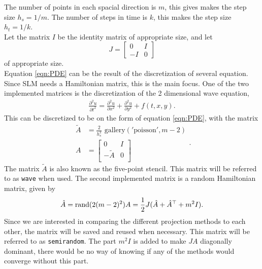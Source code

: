 The number of points in each spacial direction is $m$, this gives makes the step size $h_s = 1/m$. The number of steps in time is $k$, this makes the step size $h_t = 1/k$.\\

Let the matrix $I$ be the identity matrix of appropriate size, and let 
\begin{equation}
J = 
\begin{bmatrix}
0&I\\-I&0
\end{bmatrix}
\end{equation}
of appropriate size.\\

Equation \eqref{eqn:PDE} can be the result of the discretization of several equation. Since SLM needs a Hamiltonian matrix, this is the main focus. One of the two implemented matrices is the discretization of the 2 dimensional wave equation, 
\begin{equation}
\begin{aligned}
\frac{\partial^2 u}{\partial t^2} = \frac{\partial^2 u}{\partial x^2}+ \frac{\partial^2 u}{\partial y^2} + f(t,x,y).
\end{aligned}
\label{eqn:wave}
\end{equation}
This can be discretized to be on the form of equation \eqref{eqn:PDE}, with the matrix
\begin{equation}
\begin{aligned}
\tilde{A} &= \frac{2}{h_s^2} \text{ gallery}('\text{poisson}', m-2) \\
A &= 
\begin{bmatrix}
 0 & I \\ - \tilde{A} & 0 \\
\end{bmatrix}
\end{aligned}.
\end{equation}
The matrix $\tilde{A}$ is also known as the five-point stencil. This matrix will be referred to as \texttt{wave} when used. The second implemented matrix is a random Hamiltonian matrix, given by
\begin{equation}
\hat{A} = \text{rand}(2 (m-2)^2) \\
A = \frac{1}{2} J (\hat{A} + \hat{A}^\top + m^2 I).
\end{equation}
Since we are interested in comparing the different projection methods to each other, the matrix will be saved and reused when necessary. This matrix will be referred to as \texttt{semirandom}. The part $m^2 I $ is added to make $JA$ diagonally dominant, there would be no way of knowing if any of the methods would converge without this part.%


